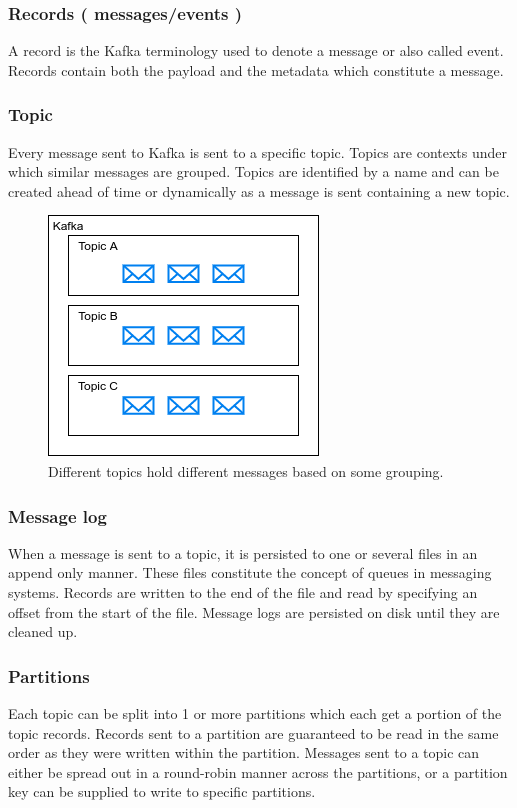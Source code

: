 \documentclass[11pt]{article}
\begin{document}
\subsubsection{Records ( messages/events ) }
A record is the Kafka terminology used to denote a message or also called event. Records contain both the payload and the metadata which constitute a message.

\subsubsection{Topic}
Every message sent to Kafka is sent to a specific topic. Topics are contexts under which similar messages are grouped. Topics are identified by a name and can be created ahead of time or dynamically as a message is sent containing a new topic.

\begin{figure}[htbp]
\centerline{\includegraphics[scale=0.7]{assets/topics.png}}
\caption{Different topics hold different messages based on some grouping.}
\label{fig}
\end{figure}

\subsubsection{Message log}

When a message is sent to a topic, it is persisted to one or several files in an append only manner. These files constitute the concept of queues in messaging systems. Records are written to the end of the file and read by specifying an offset from the start of the file. Message logs are persisted on disk until they are cleaned up.


\subsubsection{Partitions}
Each topic can be split into 1 or more partitions which each get a portion of the topic records. Records sent to a partition are guaranteed to be read in the same order as they were written within the partition. Messages sent to a topic can either be spread out in a round-robin manner across the partitions, or a partition key can be supplied to write to specific partitions.
\end{document}

